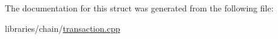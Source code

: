 The documentation for this struct was generated from the following file\+:\begin{DoxyCompactItemize}
\item 
libraries/chain/\mbox{\hyperlink{transaction_8cpp}{transaction.\+cpp}}\end{DoxyCompactItemize}
